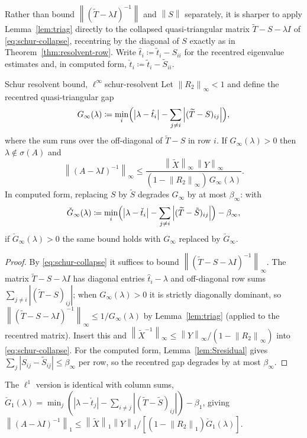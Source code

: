 \documentclass[11pt, a4paper]{article}
\numberwithin{equation}{section}
\newcommand{\norm}[1]{\left\|#1\right\|}
\newcommand{\abs}[1]{\left|#1\right|}
\newcommand{\tX}{\widetilde{X}}
\newcommand{\tT}{\widetilde{T}}
\begin{document}
Rather than bound $\norm{(\tT - \lambda I)^{-1}}$ and $\norm{S}$ separately, it
is sharper to apply Lemma~\ref{lem:triag} directly to the collapsed
quasi-triangular matrix $\tT - S - \lambda I$ of \eqref{eq:schur-collapse},
recentring by the diagonal of $S$ exactly as in
Theorem~\ref{thm:resolvent-row}.  Write $\hat t_i \coloneqq \tilde t_i - S_{ii}$
for the recentred eigenvalue estimates and, in computed form, $\check t_i
\coloneqq \tilde t_i - \tilde S_{ii}$.

\begin{theorem}{Schur resolvent bound, $\ell^\infty$}{schur-resolvent}
  Let $\norm{R_2}_\infty < 1$ and define the recentred quasi-triangular gap
  \[
    G_\infty(\lambda) \coloneqq \min_i\Bigl(\abs{\lambda - \hat t_i}
      - \sum_{j \ne i}\abs{(\tT - S)_{ij}}\Bigr),
  \]
  where the sum runs over the off-diagonal of $\tT - S$ in row $i$.  If
  $G_\infty(\lambda) > 0$ then $\lambda \notin \sigma(A)$ and
  \[
    \norm{(A - \lambda I)^{-1}}_\infty
      \le \frac{\norm{\tX}_\infty\,\norm{Y}_\infty}
               {(1 - \norm{R_2}_\infty)\,G_\infty(\lambda)}.
  \]
  In computed form, replacing $S$ by $\tilde S$ degrades $G_\infty$ by at most
  $\beta_\infty$: with
  \[
    \check G_\infty(\lambda) \coloneqq \min_i\Bigl(\abs{\lambda - \check t_i}
      - \sum_{j\ne i}\abs{(\tT - \tilde S)_{ij}}\Bigr) - \beta_\infty,
  \]
  if $\check G_\infty(\lambda) > 0$ the same bound holds with $G_\infty$
  replaced by $\check G_\infty$.
\end{theorem}

\begin{proof}
By \eqref{eq:schur-collapse} it suffices to bound $\norm{(\tT - S - \lambda
I)^{-1}}_\infty$.  The matrix $\tT - S - \lambda I$ has diagonal entries
$\hat t_i - \lambda$ and off-diagonal row sums $\sum_{j\ne i}\abs{(\tT -
S)_{ij}}$; when $G_\infty(\lambda) > 0$ it is strictly diagonally dominant,
so $\norm{(\tT - S - \lambda I)^{-1}}_\infty \le 1/G_\infty(\lambda)$ by
Lemma~\ref{lem:triag} (applied to the recentred matrix).  Insert this and
$\norm{\tX^{-1}}_\infty \le \norm{Y}_\infty/(1 - \norm{R_2}_\infty)$ into
\eqref{eq:schur-collapse}.  For the computed form, Lemma~\ref{lem:Sresidual}
gives $\sum_j\abs{S_{ij} - \tilde S_{ij}} \le \beta_\infty$ per row, so the
recentred gap degrades by at most $\beta_\infty$.
\end{proof}

The $\ell^1$ version is identical with column sums, $\check G_1(\lambda) =
\min_j(\abs{\lambda - \check t_j} - \sum_{i\ne j}\abs{(\tT - \tilde S)_{ij}}) -
\beta_1$, giving $\norm{(A - \lambda I)^{-1}}_1 \le \norm{\tX}_1\norm{Y}_1 /
[(1 - \norm{R_2}_1)\check G_1(\lambda)]$.
\end{document}
